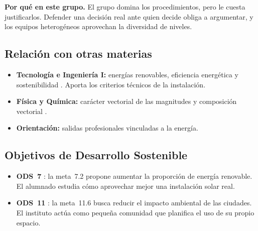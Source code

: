 \textbf{Por qué en este grupo.} El grupo domina los procedimientos, pero le cuesta justificarlos. Defender una decisión real ante quien decide obliga a argumentar, y los equipos heterogéneos aprovechan la diversidad de niveles.

\subsection{Relación con otras materias}
\begin{itemize}
  \item \textbf{Tecnología e Ingeniería I:} energías renovables, eficiencia energética y sostenibilidad \parencite[p.~385]{decreto64}. Aporta los criterios técnicos de la instalación.
  \item \textbf{Física y Química:} carácter vectorial de las magnitudes y composición vectorial \parencite[p.~166]{decreto64}.
  \item \textbf{Orientación:} salidas profesionales vinculadas a la energía.
\end{itemize}

\subsection{Objetivos de Desarrollo Sostenible}
\begin{itemize}
  \item \textbf{ODS~7} \parencite{onu7}: la meta~7.2 propone aumentar la proporción de energía renovable. El alumnado estudia cómo aprovechar mejor una instalación solar real.
  \item \textbf{ODS~11} \parencite{onu11}: la meta~11.6 busca reducir el impacto ambiental de las ciudades. El instituto actúa como pequeña comunidad que planifica el uso de su propio espacio.
\end{itemize}
